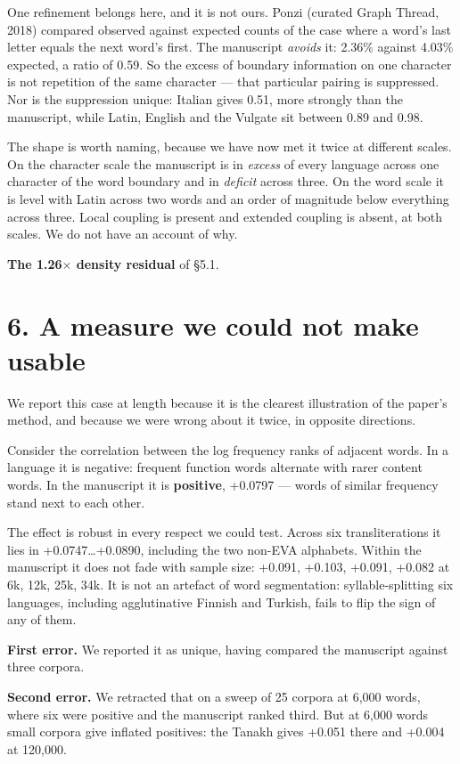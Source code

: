 \documentclass[11pt,a4paper]{article}
\begin{document}
One refinement belongs here, and it is not ours. Ponzi (curated Graph Thread, 2018) compared observed against expected counts of the case where a word's last letter equals the next word's first. The manuscript \emph{avoids} it: 2.36\% against 4.03\% expected, a ratio of 0.59. So the excess of boundary information on one character is not repetition of the same character --- that particular pairing is suppressed. Nor is the suppression unique: Italian gives 0.51, more strongly than the manuscript, while Latin, English and the Vulgate sit between 0.89 and 0.98.


The shape is worth naming, because we have now met it twice at different scales. On the character scale the manuscript is in \emph{excess} of every language across one character of the word boundary and in \emph{deficit} across three. On the word scale it is level with Latin across two words and an order of magnitude below everything across three. Local coupling is present and extended coupling is absent, at both scales. We do not have an account of why.


\textbf{The 1.26$\times$ density residual} of \S5.1.

\section*{6. A measure we could not make usable}


We report this case at length because it is the clearest illustration of the paper's method, and because we were wrong about it twice, in opposite directions.


Consider the correlation between the log frequency ranks of adjacent words. In a language it is negative: frequent function words alternate with rarer content words. In the manuscript it is \textbf{positive}, +0.0797 --- words of similar frequency stand next to each other.


The effect is robust in every respect we could test. Across six transliterations it lies in +0.0747\ldots{}+0.0890, including the two non-EVA alphabets. Within the manuscript it does not fade with sample size: +0.091, +0.103, +0.091, +0.082 at 6k, 12k, 25k, 34k. It is not an artefact of word segmentation: syllable-splitting six languages, including agglutinative Finnish and Turkish, fails to flip the sign of any of them.


\textbf{First error.} We reported it as unique, having compared the manuscript against three corpora.


\textbf{Second error.} We retracted that on a sweep of 25 corpora at 6,000 words, where six were positive and the manuscript ranked third. But at 6,000 words small corpora give inflated positives: the Tanakh gives +0.051 there and +0.004 at 120,000.
\end{document}
